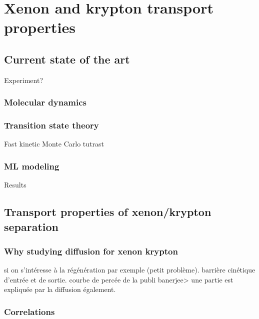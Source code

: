 \documentclass[main]{subfiles}
\begin{document}
\chapter{Xenon and krypton transport properties}
\vspace*{-1\baselineskip}

\section{Current state of the art}

Experiment? 

\subsection{Molecular dynamics}

\subsection{Transition state theory}



Fast kinetic Monte Carlo
tutrast\autocite{Mace_2019}

\subsection{ML modeling}

Results

\section{Transport properties of xenon/krypton separation}

\subsection{Why studying diffusion for xenon krypton}

si on s'intéresse à la régénération par exemple (petit problème). barrière cinétique d'entrée et de sortie.
courbe de percée de la publi banerjee> une partie est expliquée par la diffusion également.

\subsection{Correlations}
\end{document}
